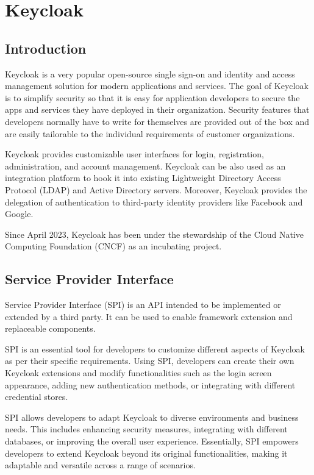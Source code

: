 \chapter{Keycloak} \label{keycloak}

\section{Introduction}
Keycloak is a very popular open-source single sign-on and identity and access management solution for modern applications and services.
The goal of Keycloak is to simplify security so that it is easy for application developers to secure the apps and services they have deployed in their organization.
Security features that developers normally have to write for themselves are provided out of the box and are easily tailorable to the individual requirements of customer organizations.

Keycloak provides customizable user interfaces for login, registration, administration, and account management.
Keycloak can be also used as an integration platform to hook it into existing Lightweight Directory Access Protocol (LDAP) and Active Directory servers.
Moreover, Keycloak provides the delegation of authentication to third-party identity providers like Facebook and Google.

Since April 2023, Keycloak has been under the stewardship of the Cloud Native Computing Foundation (CNCF) as an incubating project.\cite{keycloak-web}

\section{Service Provider Interface}\label{keycloak-spi}
Service Provider Interface (SPI) is an API intended to be implemented or extended by a third party.
It can be used to enable framework extension and replaceable components.\cite{keycloak-spi}

SPI is an essential tool for developers to customize different aspects of Keycloak as per their specific requirements.
Using SPI, developers can create their own Keycloak extensions and modify functionalities such as the login screen appearance, adding new authentication methods, or integrating with different credential stores.

SPI allows developers to adapt Keycloak to diverse environments and business needs.
This includes enhancing security measures, integrating with different databases, or improving the overall user experience. Essentially, SPI empowers developers to extend Keycloak beyond its original functionalities, making it adaptable and versatile across a range of scenarios.

